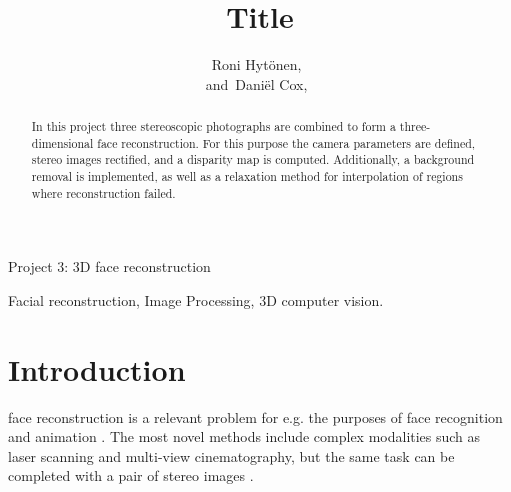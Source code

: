 \documentclass[journal]{IEEEtran}
\begin{document}
%
\title{Title}
%

\author{Roni Hyt\"{o}nen,~  
      
        and~Dani\"el Cox,~%

}



%
{Project 3: 3D face reconstruction}


\maketitle


\begin{abstract}
In this project three stereoscopic photographs are combined to form a three-dimensional face reconstruction. 
For this purpose the camera parameters are defined, stereo images rectified, and a disparity map is computed.
Additionally, a background removal is implemented, as well as a relaxation method for interpolation of regions where reconstruction failed.

\end{abstract}

\begin{IEEEkeywords}
Facial reconstruction, Image Processing, 3D computer vision.
\end{IEEEkeywords}


\IEEEpeerreviewmaketitle



\section{Introduction}
% 
% 
% 
% 
 face reconstruction is a relevant problem for e.g. the purposes of face recognition and animation \cite{3D_Peng}.
The most novel methods include complex modalities such as laser scanning and multi-view cinematography, but the same task can be completed with a pair of stereo images \cite{Creation_Krutikova}.
\end{document}
